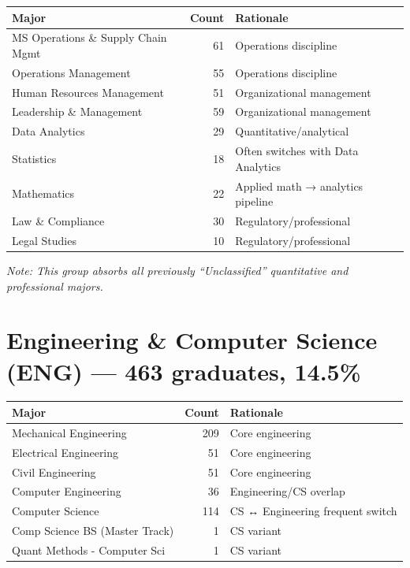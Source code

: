 \documentclass[
  11pt,
  letterpaper,
]{report}
\begin{document}
\begin{longtable}[]{@{}lrl@{}}
\toprule\noalign{}
Major & Count & Rationale \\
\midrule\noalign{}
\endhead
\bottomrule\noalign{}
\endlastfoot
MS Operations \& Supply Chain Mgmt & 61 & Operations discipline \\
Operations Management & 55 & Operations discipline \\
Human Resources Management & 51 & Organizational management \\
Leadership \& Management & 59 & Organizational management \\
Data Analytics & 29 & Quantitative/analytical \\
Statistics & 18 & Often switches with Data Analytics \\
Mathematics & 22 & Applied math → analytics pipeline \\
Law \& Compliance & 30 & Regulatory/professional \\
Legal Studies & 10 & Regulatory/professional \\
\end{longtable}

\noindent\textit{Note: This group absorbs all previously ``Unclassified'' quantitative and professional majors.}

\section{Engineering \& Computer Science (ENG) --- 463 graduates,
14.5\%}\label{engineering-computer-science-eng-463-graduates-14.5}

\begin{longtable}[]{@{}lrl@{}}
\toprule\noalign{}
Major & Count & Rationale \\
\midrule\noalign{}
\endhead
\bottomrule\noalign{}
\endlastfoot
Mechanical Engineering & 209 & Core engineering \\
Electrical Engineering & 51 & Core engineering \\
Civil Engineering & 51 & Core engineering \\
Computer Engineering & 36 & Engineering/CS overlap \\
Computer Science & 114 & CS ↔ Engineering frequent switch \\
Comp Science BS (Master Track) & 1 & CS variant \\
Quant Methods - Computer Sci & 1 & CS variant \\
\end{longtable}
\end{document}
